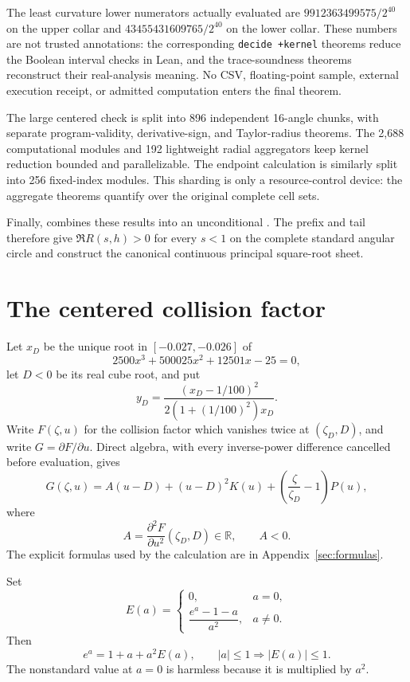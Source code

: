 \documentclass[11pt]{article}
\newcommand{\R}{\mathbb R}
\begin{document}
The least curvature lower numerators actually evaluated are
$9912363499575/2^{40}$ on the upper collar and
$43455431609765/2^{40}$ on the lower collar.  These numbers are not trusted annotations: the
corresponding \texttt{decide +kernel} theorems reduce the Boolean interval checks in Lean, and
the trace-soundness theorems reconstruct their real-analysis meaning.  No CSV, floating-point
sample, external execution receipt, or admitted computation enters the final theorem.

The large centered check is split into 896 independent 16-angle chunks, with separate
program-validity, derivative-sign, and Taylor-radius theorems.  The 2,688 computational modules
and 192 lightweight radial aggregators keep kernel reduction bounded and parallelizable.  The
endpoint calculation is similarly split into 256 fixed-index modules.  This sharding is only a
resource-control device: the aggregate theorems quantify over the original complete cell sets.

Finally,  combines these results into an unconditional
.  The prefix and tail therefore give
$\Re R(s,h)>0$ for every $s<1$ on the complete standard angular circle and construct the
canonical continuous principal square-root sheet.

\section{The centered collision factor}

Let \(x_D\) be the unique root in \([-0.027,-0.026]\) of
\[
  2500x^3+500025x^2+12501x-25=0,
\]
let \(D<0\) be its real cube root, and put
\[
  y_D=\frac{(x_D-1/100)^2}{2(1+(1/100)^2)x_D}.
\]
Write \(F(\zeta,u)\) for the collision factor which vanishes twice at
\((\zeta_D,D)\), and write \(G=\partial F/\partial u\). Direct algebra, with every
inverse-power difference cancelled before evaluation, gives
\begin{equation}\label{eq:centered-expansion}
 G(\zeta,u)
 =A(u-D)+(u-D)^2K(u)
   +\left(\frac{\zeta}{\zeta_D}-1\right)P(u),
\end{equation}
where
\[
 A=\frac{\partial^2F}{\partial u^2}(\zeta_D,D)\in\R,
 \qquad A<0.
\]
The explicit formulas used by the calculation are in Appendix~\ref{sec:formulas}.

Set
\[
 E(a)=
 \begin{cases}
  0,&a=0,\\
  \dfrac{e^a-1-a}{a^2},&a\ne0.
 \end{cases}
\]
Then
\begin{equation}\label{eq:exp-remainder}
 e^a=1+a+a^2E(a),
 \qquad |a|\leq1\Longrightarrow |E(a)|\leq1.
\end{equation}
The nonstandard value at \(a=0\) is harmless because it is multiplied by \(a^2\).
\end{document}
